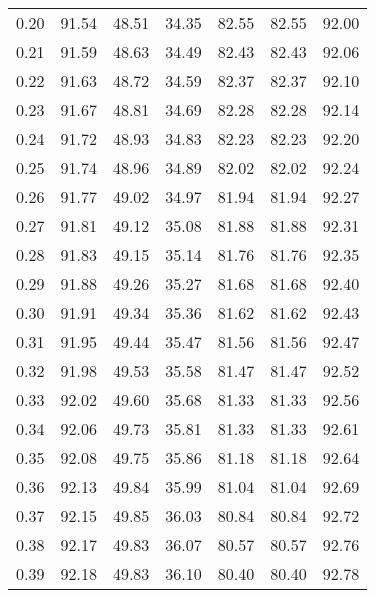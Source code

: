 \begin{tabular}{|c|c|c|c|c|c|c|}
      0.20 &     91.54 &     48.51 &      34.35 &   82.55 &      82.55 &         92.00 \\
      0.21 &     91.59 &     48.63 &      34.49 &   82.43 &      82.43 &         92.06 \\
      0.22 &     91.63 &     48.72 &      34.59 &   82.37 &      82.37 &         92.10 \\
      0.23 &     91.67 &     48.81 &      34.69 &   82.28 &      82.28 &         92.14 \\
      0.24 &     91.72 &     48.93 &      34.83 &   82.23 &      82.23 &         92.20 \\
      0.25 &     91.74 &     48.96 &      34.89 &   82.02 &      82.02 &         92.24 \\
      0.26 &     91.77 &     49.02 &      34.97 &   81.94 &      81.94 &         92.27 \\
      0.27 &     91.81 &     49.12 &      35.08 &   81.88 &      81.88 &         92.31 \\
      0.28 &     91.83 &     49.15 &      35.14 &   81.76 &      81.76 &         92.35 \\
      0.29 &     91.88 &     49.26 &      35.27 &   81.68 &      81.68 &         92.40 \\
      0.30 &     91.91 &     49.34 &      35.36 &   81.62 &      81.62 &         92.43 \\
      0.31 &     91.95 &     49.44 &      35.47 &   81.56 &      81.56 &         92.47 \\
      0.32 &     91.98 &     49.53 &      35.58 &   81.47 &      81.47 &         92.52 \\
      0.33 &     92.02 &     49.60 &      35.68 &   81.33 &      81.33 &         92.56 \\
      0.34 &     92.06 &     49.73 &      35.81 &   81.33 &      81.33 &         92.61 \\
      0.35 &     92.08 &     49.75 &      35.86 &   81.18 &      81.18 &         92.64 \\
      0.36 &     92.13 &     49.84 &      35.99 &   81.04 &      81.04 &         92.69 \\
      0.37 &     92.15 &     49.85 &      36.03 &   80.84 &      80.84 &         92.72 \\
      0.38 &     92.17 &     49.83 &      36.07 &   80.57 &      80.57 &         92.76 \\
      0.39 &     92.18 &     49.83 &      36.10 &   80.40 &      80.40 &         92.78 \\

\end{tabular}
